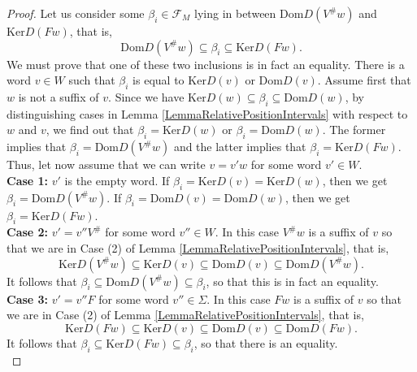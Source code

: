 \documentclass[12pt]{amsart}
\theoremstyle{definition}
\newcommand{\<}{\langle}   %
\renewcommand{\>}{\rangle} %
\begin{document}
\begin{proof}
    Let us consider some $\beta_i \in \mathcal F_M$ lying in between $\mathrm{Dom}D(V^{\#}w)$ and $\mathrm{Ker}D(Fw)$, that is, 
    \begin{equation*}
        \mathrm{Dom}D(V^{\#}w) \subseteq  \beta_i \subseteq  \mathrm{Ker}D(Fw).
    \end{equation*}
    We must prove that one of these two inclusions is in fact an equality. There is a word $v \in W$ such that $\beta_i$ is equal to $\mathrm{Ker}D(v)$ or $\mathrm{Dom}D(v)$. Assume first that $w$ is not a suffix of $v$. Since we have $\mathrm{Ker}D(w) \subseteq  \beta_i \subseteq  \mathrm{Dom}D(w)$, by distinguishing cases in Lemma \ref{LemmaRelativePositionIntervals} with respect to $w$ and $v$, we find out that $\beta_i = \mathrm{Ker}D(w)$ or $\beta_i = \mathrm{Dom}D(w)$. The former implies that $\beta_i = \mathrm{Dom}D(V^{\#}w)$ and the latter implies that $\beta_i = \mathrm{Ker}D(Fw)$. Thus, let now assume that we can write $v = v'w$ for some word $v' \in W$. \\

    \textbf{Case 1:} $v'$ is the empty word. If $\beta_i = \mathrm{Ker}D(v) = \mathrm{Ker}D(w)$, then we get $\beta_i = \mathrm{Dom}D(V^{\#}w)$. If $\beta_i = \mathrm{Dom}D(v) = \mathrm{Dom}D(w)$, then we get  $\beta_i = \mathrm{Ker}D(Fw)$. \\

    \textbf{Case 2:} $v' = v''V^{\#}$ for some word $v'' \in W$. In this case $V^{\#}w$ is a suffix of $v$ so that we are in Case (2) of Lemma \ref{LemmaRelativePositionIntervals}, that is,
    \begin{equation*}
        \mathrm{Ker}D(V^{\#}w) \subseteq  \mathrm{Ker}D(v) \subseteq  \mathrm{Dom}D(v) \subseteq  \mathrm{Dom}D(V^{\#}w).    
    \end{equation*}
    It follows that $\beta_i \subseteq  \mathrm{Dom}D(V^{\#}w) \subseteq  \beta_i$, so that this is in fact an equality.\\

    \textbf{Case 3:} $v' = v''F$ for some word $v'' \in \Sigma$. In this case $Fw$ is a suffix of $v$ so that we are in Case (2) of Lemma \ref{LemmaRelativePositionIntervals}, that is,
    \begin{equation*}
        \mathrm{Ker}D(Fw) \subseteq  \mathrm{Ker}D(v) \subseteq  \mathrm{Dom}D(v) \subseteq  \mathrm{Dom}D(Fw).    
    \end{equation*}
    It follows that $\beta_i \subseteq  \mathrm{Ker}D(Fw) \subseteq  \beta_i$, so that there is an equality.\\


\end{proof}
\end{document}
